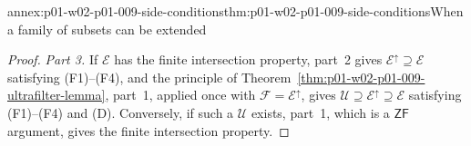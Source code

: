 \begin{annexitem}{annex:p01-w02-p01-009-side-conditions}{thm:p01-w02-p01-009-side-conditions}{When a family of subsets can be extended}
\begin{proof}
\emph{Part 3.} If \(\mathcal E\) has the finite intersection property, part~2
gives \(\mathcal E^{\uparrow}\supseteq\mathcal E\) satisfying (F1)--(F4), and
the principle of Theorem~\ref{thm:p01-w02-p01-009-ultrafilter-lemma}, part~1,
applied once with \(\mathcal F=\mathcal E^{\uparrow}\), gives
\(\mathcal U\supseteq\mathcal E^{\uparrow}\supseteq\mathcal E\) satisfying
(F1)--(F4) and (D). Conversely, if such a \(\mathcal U\) exists, part~1, which
is a \(\mathsf{ZF}\) argument, gives the finite intersection property.
\end{proof}
\end{annexitem}
